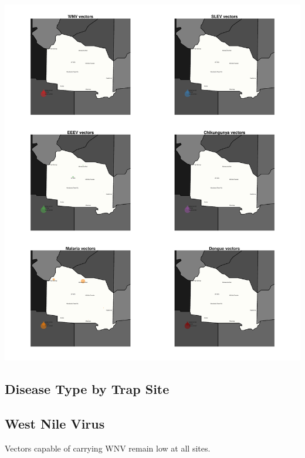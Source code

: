 \documentclass{article}
\begin{document}
\begin{center}
\includegraphics{mosq08nov13-007}
\end{center}
\newpage

\begin{center}
\section*{Disease Type by Trap Site}

\subsection*{West Nile Virus}

\end{center}

Vectors capable of carrying WNV remain low at all sites.\\
\end{document}
